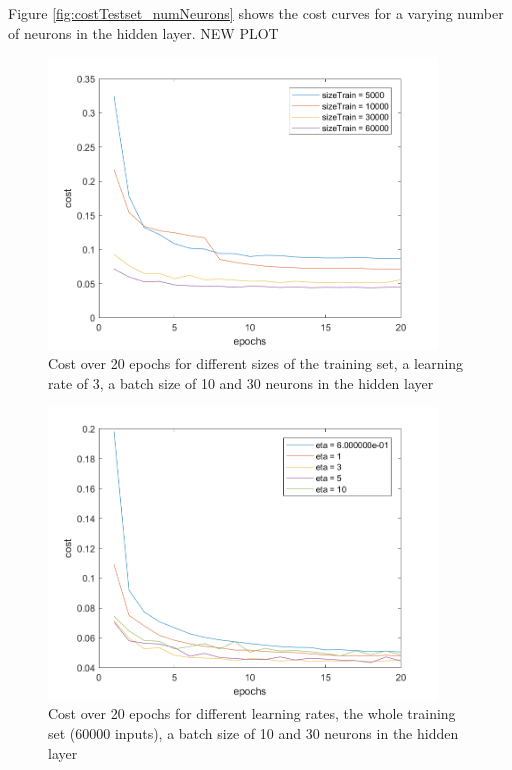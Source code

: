 Figure \ref{fig:costTestset_numNeurons} shows the cost curves for a varying number of neurons in the hidden layer. NEW PLOT

\newpage
\begin{figure}[h!]
\centering
    \centering
    \includegraphics[width=0.92\textwidth]{test_src/img/20epochs/costOverEpochs_sizeTrain}
    \caption{Cost over 20 epochs for different sizes of the training set, a learning rate of 3, a batch size of 10 and 30 neurons in the hidden layer}
    \label{fig:costTestset_sizeTrain}
\end{figure}
\begin{figure}[h!]
\centering
    \centering
    \includegraphics[width=0.92\textwidth]{test_src/img/20epochs/costOverEpochs_eta}
    \caption{Cost over 20 epochs for different learning rates, the whole training set (60000 inputs), a batch size of 10 and 30 neurons in the hidden layer}
    \label{fig:costTestset_eta}
\end{figure}

